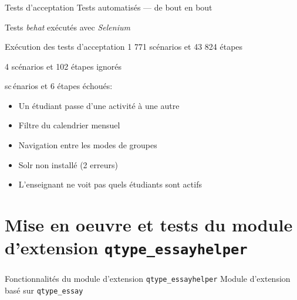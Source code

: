 \documentclass{beamer}
\begin{document}
  \begin{frame}
    \frametitle{\insertsection}
    \begin{block}{Tests d'acceptation}
      Tests automatis\'es --- de bout en bout
  
      Tests \textit{behat} ex\'ecut\'es avec \textit{Selenium}
    \end{block}
  
    \vfill
  
    \begin{block}{Ex\'ecution des tests d'acceptation}
      1 771 sc\'enarios et 43 824 \'etapes

      \medskip

      4 sc\'enarios et 102 \'etapes ignor\'es

       sc\,énarios et 6 \'etapes \'echou\'es:
      {\footnotesize
      \begin{itemize}
        \item Un \'etudiant passe d'une activit\'e \`a une autre
        \item Filtre du calendrier mensuel
        \item Navigation entre les modes de groupes
        \item Solr non install\'e (2 erreurs)
        \item L'enseignant ne voit pas quels \'etudiants sont actifs
      \end{itemize}
    }
    \end{block}
    \vfill
  \end{frame}
  
  \section[Mise en oeuvre]{Mise en oeuvre et tests du module d'extension \texttt{qtype\_essayhelper}}
  \begin{frame}
    \frametitle{\insertsection}
    \begin{block}{Fonctionnalit\'es du module d'extension \texttt{qtype\_essayhelper}}
      Module d'extension bas\'e sur \texttt{qtype\_essay}
    \end{block}
  \end{frame}
  
\end{document}
